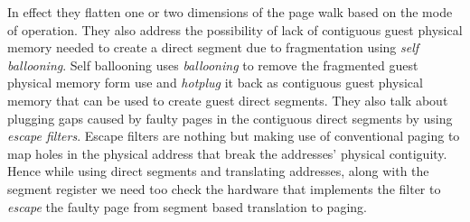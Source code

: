 In effect they flatten one or two dimensions of the page walk based on the mode of operation. They also address the possibility of lack of contiguous guest physical memory needed to create a direct segment due to fragmentation using \textit{self ballooning}. Self ballooning uses \textit{ballooning} to remove the fragmented guest physical memory form use and \textit{hotplug} it back as contiguous guest physical memory that can be used to create guest direct segments. They also talk about plugging gaps caused by faulty pages in the contiguous direct segments by using \textit{escape filters}. Escape filters are nothing but making use of conventional paging to map holes in the physical address that break the addresses' physical contiguity. Hence while using direct segments and translating addresses, along with the segment register we need too check the hardware that implements the filter to \textit{escape} the faulty page from segment based translation to paging.     